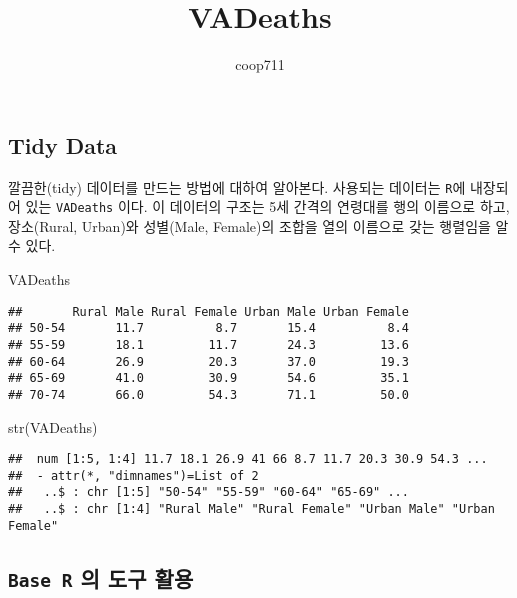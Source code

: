 \documentclass[
]{article}
\title{VADeaths}
\author{coop711}
\date{}
\newenvironment{Shaded}{\begin{snugshade}}{\end{snugshade}}
\newcommand{\FunctionTok}[1]{\textcolor[rgb]{0.00,0.00,0.00}{#1}}
\newcommand{\NormalTok}[1]{#1}
\begin{document}
\maketitle

\hypertarget{tidy-data}{%
\subsection{Tidy Data}\label{tidy-data}}

깔끔한(tidy) 데이터를 만드는 방법에 대하여 알아본다. 사용되는 데이터는
\texttt{R}에 내장되어 있는 \texttt{VADeaths} 이다. 이 데이터의 구조는
5세 간격의 연령대를 행의 이름으로 하고, 장소(Rural, Urban)와 성별(Male,
Female)의 조합을 열의 이름으로 갖는 행렬임을 알 수 있다.

\begin{Shaded}
\begin{Highlighting}[]
\NormalTok{VADeaths}
\end{Highlighting}
\end{Shaded}

\begin{verbatim}
##       Rural Male Rural Female Urban Male Urban Female
## 50-54       11.7          8.7       15.4          8.4
## 55-59       18.1         11.7       24.3         13.6
## 60-64       26.9         20.3       37.0         19.3
## 65-69       41.0         30.9       54.6         35.1
## 70-74       66.0         54.3       71.1         50.0
\end{verbatim}

\begin{Shaded}
\begin{Highlighting}[]
\FunctionTok{str}\NormalTok{(VADeaths)}
\end{Highlighting}
\end{Shaded}

\begin{verbatim}
##  num [1:5, 1:4] 11.7 18.1 26.9 41 66 8.7 11.7 20.3 30.9 54.3 ...
##  - attr(*, "dimnames")=List of 2
##   ..$ : chr [1:5] "50-54" "55-59" "60-64" "65-69" ...
##   ..$ : chr [1:4] "Rural Male" "Rural Female" "Urban Male" "Urban Female"
\end{verbatim}

\hypertarget{base-r-uxc758-uxb3c4uxad6c-uxd65cuxc6a9}{%
\subsection{\texorpdfstring{\texttt{Base\ R} 의 도구
활용}{Base R 의 도구 활용}}\label{base-r-uxc758-uxb3c4uxad6c-uxd65cuxc6a9}}
\end{document}
